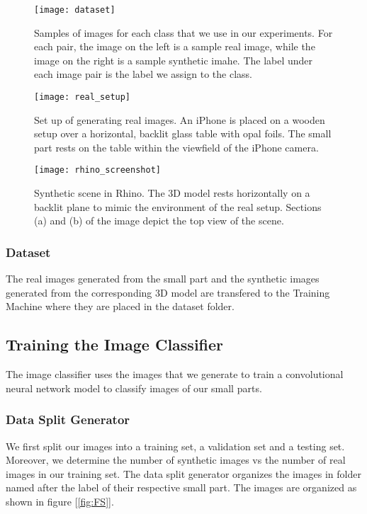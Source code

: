 \begin{figure}[H]
\centering
  \texttt{[image: dataset]}
\caption{Samples of images for each class that we use in our experiments. For each pair, the image on the left is a sample real image, while the image on the right is a sample synthetic imahe. The label under each image pair is the label we assign to the class.}
\label{fig:Dataset}
\end{figure}

\begin{figure}[H]
\centering
  \texttt{[image: real\_setup]}
\caption{Set up of generating real images. An iPhone is placed on a wooden setup over a horizontal, backlit glass table with opal foils. The small part rests on the table within the viewfield of the iPhone camera.}
\label{fig:RealSetup}
\end{figure}

\begin{figure}[H]
\centering
  \texttt{[image: rhino\_screenshot]}
\caption{Synthetic scene in Rhino. The 3D model rests horizontally on a backlit plane to mimic the environment of the real setup. Sections (a) and (b) of the image depict the top view of the scene.}
\label{fig:RhinoScreenshot}
\end{figure}

\subsubsection{Dataset}
The real images generated from the small part and the synthetic images generated from the corresponding 3D model are transfered to the Training Machine where they are placed in the dataset folder.

\subsection{Training the Image Classifier}
The image classifier uses the images that we generate to train a convolutional neural network model to classify images of our small parts.

\subsubsection{Data Split Generator}
We first split our images into a training set, a validation set and a testing set. Moreover, we determine the number of synthetic images vs the number of real images in our training set. The data split generator organizes the images in folder named after the label of their respective small part. The images are organized as shown in figure [\ref{fig:FS}].


